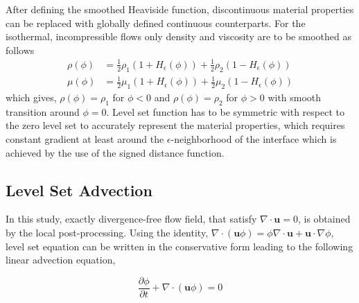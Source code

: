 \documentclass[11pt,a4paper,twoside]{article}
\begin{document}
	After defining the smoothed Heaviside function, discontinuous material properties can be replaced with globally defined continuous counterparts. For the isothermal, incompressible flows only density and viscosity are to be smoothed as follows
	\begin{equation}
	\label{Eq.SmoothedMaterialProperties}
	\begin{aligned}
	\rho(\phi) &= \frac{1}{2}\rho_1 \left(  1+ H_{\epsilon}(\phi) \right) + \frac{1}{2}\rho_2 \left(  1- H_{\epsilon}(\phi) \right)\\
	\mu(\phi) &= \frac{1}{2}\mu_1 \left(  1+ H_{\epsilon}(\phi) \right) + \frac{1}{2}\mu_2 \left(  1- H_{\epsilon}(\phi) \right)
	\end{aligned}
	\end{equation}
	which gives, $ \rho(\phi) = \rho_1 $  for $ \phi<0 $ and $ \rho(\phi) = \rho_2 $  for $ \phi>0 $ with smooth transition around $ \phi = 0 $. Level set function has to be symmetric with respect to the zero level set to accurately represent the material properties, which requires constant gradient at least around the $ \epsilon $-neighborhood of the interface which is achieved by the use of the signed distance function. 
	
	\subsection{Level Set Advection}
	
	In this study, exactly divergence-free flow field, that satisfy $\nabla \cdotp \textbf{u} =0$,  is obtained by the local post-processing.  Using the identity, $\nabla \cdotp (\textbf{u} \phi) =\phi  \nabla\cdotp\textbf{u} +\textbf{u}\cdotp \nabla\phi$,  level set equation can be written in the conservative form leading to the following linear advection equation,
	
	\begin{equation}
	\label{Eq.LevelSetEquation}
	\frac{\partial\phi}{\partial t} +   \nabla \cdotp (\textbf{u}\phi) =  0
	\end{equation}
	
\end{document}
